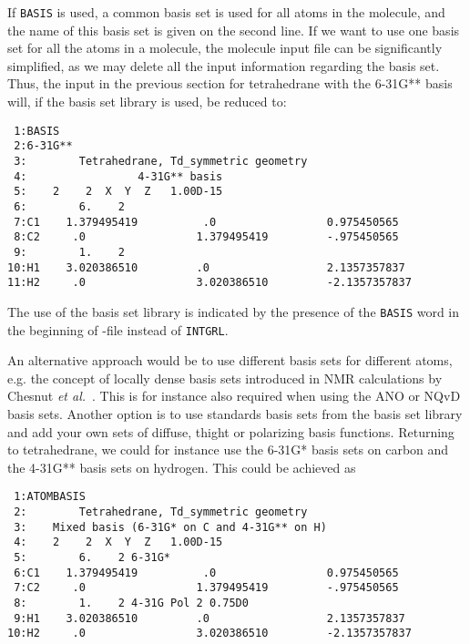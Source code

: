 If {\tt BASIS} is used, a common basis set is used for all atoms in
the molecule, and the name of this basis set is given on the second line.
If we want to use one basis set for all the
atoms in a molecule, the molecule input file can be significantly
simplified, as we may delete all the input information regarding the
basis set. Thus, the input in the previous section for tetrahedrane
with the 6-31G** basis will, if the basis set library is used,  be reduced
to:

\begin{verbatim}
 1:BASIS
 2:6-31G**
 3:        Tetrahedrane, Td_symmetric geometry
 4:                 4-31G** basis
 5:    2    2  X  Y  Z   1.00D-15
 6:        6.    2
 7:C1    1.379495419          .0                 0.975450565
 8:C2     .0                 1.379495419         -.975450565
 9:        1.    2
10:H1    3.020386510         .0                  2.1357357837
11:H2     .0                 3.020386510         -2.1357357837
\end{verbatim}

The use of the basis set library is indicated by the presence of the
\verb|BASIS| word in the beginning of \mol-file instead of
\verb|INTGRL|.

An alternative approach would be to use different basis sets for
different atoms, e.g. the concept of locally dense basis sets
introduced in NMR calculations by Chesnut {\it et
al.\/}~\cite{dbcberkdmdaejcc14}. This is for instance also required
when using the ANO or NQvD
basis sets. Another option is to use
standards basis sets from the basis set library and add your own sets
of diffuse, thight or polarizing basis
functions. Returning to
tetrahedrane, we could for instance use the 6-31G* basis sets on
carbon and the 4-31G** basis sets on hydrogen. This could be achieved
as

\begin{verbatim}
 1:ATOMBASIS
 2:        Tetrahedrane, Td_symmetric geometry
 3:    Mixed basis (6-31G* on C and 4-31G** on H)
 4:    2    2  X  Y  Z   1.00D-15
 5:        6.    2 6-31G*
 6:C1    1.379495419          .0                 0.975450565
 7:C2     .0                 1.379495419         -.975450565
 8:        1.    2 4-31G Pol 2 0.75D0
 9:H1    3.020386510         .0                  2.1357357837
10:H2     .0                 3.020386510         -2.1357357837
\end{verbatim}



